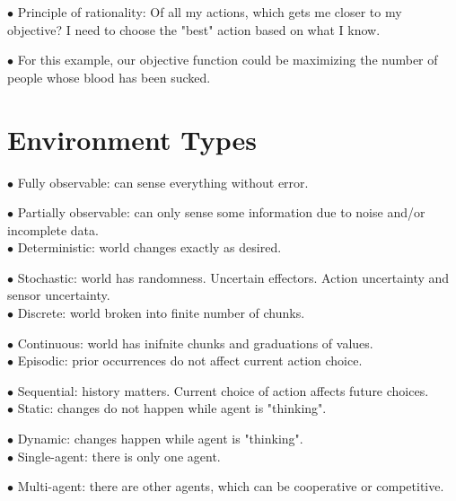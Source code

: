 \documentclass[english,openany]{book}
\begin{document}
    $\bullet$ Principle of rationality: Of all my actions, which gets me closer to my objective? I need to choose the "best" action based on what I know.

    $\bullet$ For this example, our objective function could be maximizing the number of people whose blood has been sucked.


    \section{Environment Types}

    $\bullet$ Fully observable: can sense everything without error.

    $\bullet$ Partially observable: can only sense some information due to noise and/or incomplete data.\\

    $\bullet$ Deterministic: world changes exactly as desired.

    $\bullet$ Stochastic: world has randomness. Uncertain effectors. Action uncertainty and sensor uncertainty.\\

    $\bullet$ Discrete: world broken into finite number of chunks.

    $\bullet$ Continuous: world has inifnite chunks and graduations of values.\\

    $\bullet$ Episodic: prior occurrences do not affect current action choice.

    $\bullet$ Sequential: history matters. Current choice of action affects future choices.\\

    $\bullet$ Static: changes do not happen while agent is "thinking".

    $\bullet$ Dynamic: changes happen while agent is "thinking".\\

    $\bullet$ Single-agent: there is only one agent.

    $\bullet$ Multi-agent: there are other agents, which can be cooperative or competitive.\\
\end{document}
